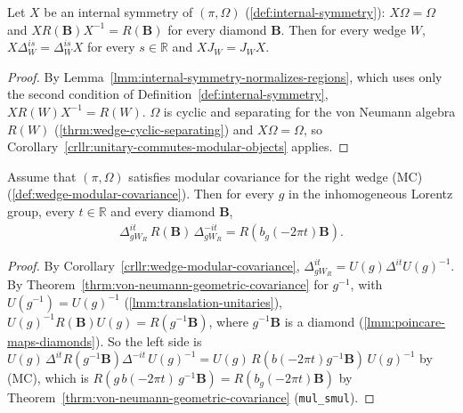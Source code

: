\begin{lemma}
    \label{lmm:internal-symmetry-commutes-wedge-modular}
    \leanok
    Let $X$ be an internal symmetry of $(\pi, \Omega)$ (\ref{def:internal-symmetry}): $X\Omega = \Omega$ and $XR(\mathbf{B})X^{-1} = R(\mathbf{B})$ for every diamond $\mathbf{B}$. Then for every wedge $W$, $X\Delta_W^{is} = \Delta_W^{is}X$ for every $s \in \mathbb{R}$ and $XJ_W = J_WX$.
\end{lemma}
\begin{proof}
    \leanok
    By Lemma~\ref{lmm:internal-symmetry-normalizes-regions}, which uses only the second condition of Definition~\ref{def:internal-symmetry}, $XR(W)X^{-1} = R(W)$. $\Omega$ is cyclic and separating for the von Neumann algebra $R(W)$ (\ref{thrm:wedge-cyclic-separating}) and $X\Omega = \Omega$, so Corollary~\ref{crllr:unitary-commutes-modular-objects} applies.
\end{proof}

\begin{lemma}
    \label{lmm:modular-covariance-all-wedges}
    \leanok
    Assume that $(\pi, \Omega)$ satisfies modular covariance for the right wedge (MC) (\ref{def:wedge-modular-covariance}). Then for every $g$ in the inhomogeneous Lorentz group, every $t \in \mathbb{R}$ and every diamond $\mathbf{B}$,
    \begin{align}
        \Delta_{gW_R}^{it}\,R(\mathbf{B})\,\Delta_{gW_R}^{-it} = R(b_g(-2\pi t)\mathbf{B}).
    \end{align}
\end{lemma}
\begin{proof}
    \leanok
    By Corollary~\ref{crllr:wedge-modular-covariance}, $\Delta_{gW_R}^{it} = U(g)\Delta^{it}U(g)^{-1}$. By Theorem~\ref{thrm:von-neumann-geometric-covariance} for $g^{-1}$, with $U(g^{-1}) = U(g)^{-1}$ (\ref{lmm:translation-unitaries}), $U(g)^{-1}R(\mathbf{B})U(g) = R(g^{-1}\mathbf{B})$, where $g^{-1}\mathbf{B}$ is a diamond (\ref{lmm:poincare-maps-diamonds}). So the left side is $U(g)\,\Delta^{it}R(g^{-1}\mathbf{B})\Delta^{-it}\,U(g)^{-1} = U(g)\,R(b(-2\pi t)g^{-1}\mathbf{B})\,U(g)^{-1}$ by (MC), which is $R(g\,b(-2\pi t)\,g^{-1}\mathbf{B}) = R(b_g(-2\pi t)\mathbf{B})$ by Theorem~\ref{thrm:von-neumann-geometric-covariance} (\texttt{mul\_smul}).
\end{proof}

